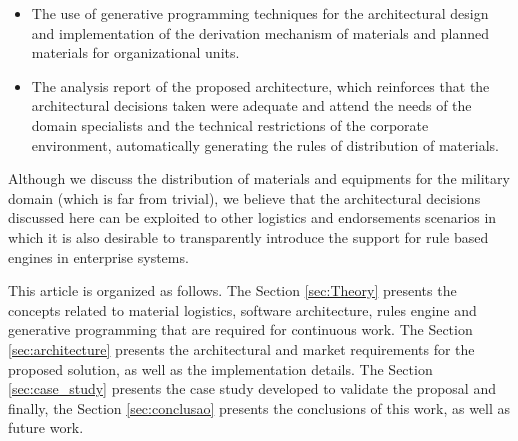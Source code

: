 \begin{itemize}
\item The use of generative programming techniques for the architectural design and implementation of the derivation mechanism of materials and planned materials for organizational units.

\item The analysis report of the proposed architecture, which reinforces that the architectural decisions taken were adequate and attend the needs of the domain specialists and the technical restrictions of the corporate environment, automatically generating the rules of distribution of materials.
\end{itemize} 


Although we discuss the distribution of materials and equipments for the military domain (which is far from trivial), we believe that the architectural decisions discussed here can be exploited to other logistics and endorsements scenarios in which it is also desirable to transparently introduce the support for rule based engines in enterprise systems.


This article is organized as follows. The Section \ref{sec:Theory} presents the concepts related to material logistics, software architecture, rules engine and generative programming that are required for continuous work. The Section \ref{sec:architecture} presents the architectural and market requirements for the proposed solution, as well as the implementation details. The Section \ref{sec:case_study} presents the case study developed to validate the proposal and finally, the Section \ref{sec:conclusao} presents the conclusions of this work, as well as future work.

